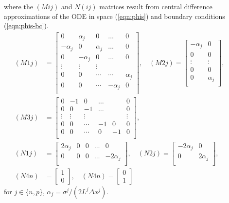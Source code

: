 \documentclass[12pt]{article}
\begin{document}
where the $(Mij)$ and $N(ij)$ matrices result from central difference approximations of the ODE in space (\ref{eqn:phis}) and boundary conditions (\ref{eqn:phis-bc}).
\begin{align}
(M1j) &=
\left[
\begin{array}{ccccc}
 0 & \alpha_{j} & 0 & \ldots & 0  \\
 -\alpha_{j} & 0 & \alpha_{j} & \ldots & 0  \\
 0 & -\alpha_{j} & 0 & \ldots & 0  \\
 \vdots & \vdots & \vdots &  &  \\
 0 & 0 & \cdots & \cdots & \alpha_{j} \\
 0 & 0 & \cdots & -\alpha_{j} & 0 \\
\end{array}
\right], \quad
(M2j) =
\left[
\begin{array}{cc}
 -\alpha_{j} & 0  \\
 0 & 0 \\
 \vdots & \vdots  \\
 0 & 0 \\
 0 & \alpha_{j} \\
\end{array}
\right], \qquad \\
(M3j) &=
\left[
\begin{array}{cccccc}
 0 & -1 & 0 & \ldots & & 0  \\
 0 & 0 & -1 & \ldots & & 0  \\
 \vdots & \vdots & \vdots & & & \vdots \\
 0 & 0 & \cdots & -1 & 0 & 0 \\
 0 & 0 & \cdots & 0 & -1 & 0 \\
\end{array}
\right], \quad \\
(N1j) &=
\left[
\begin{array}{ccccc}
 2\alpha_{j} & 0 & 0 & \ldots & 0  \\
 0 & 0 & 0 & \ldots & -2\alpha_{j}  \\
\end{array}
\right], \quad
(N2j) = 
\left[
\begin{array}{cc}
 -2\alpha_{j} & 0 \\
 0 & 2\alpha_{j} \\
\end{array}
\right], \\
(N4n) &= 
\left[
\begin{array}{c}
  1 \\
  0
\end{array}
\right], \quad
(N4n) = 
\left[
\begin{array}{c}
  0 \\
  1
\end{array}
\right]
\end{align}
for $j \in \{n,p\}$, $\alpha_{j} = \sigma^{j} / (2 L^{j} \Delta x^{j})$.
\end{document}
